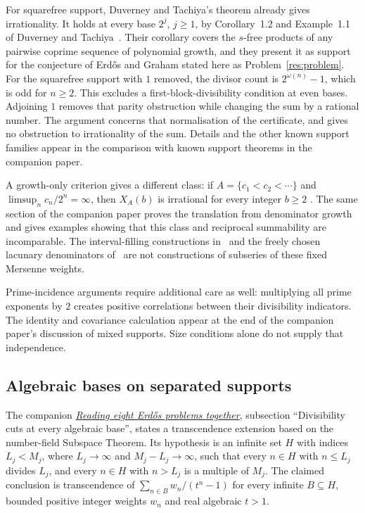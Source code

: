 \documentclass[11pt]{article}
\begin{document}
For squarefree support, Duverney and Tachiya's theorem already gives
irrationality.  It holds at every base $2^j$, $j\ge1$, by Corollary~1.2 and Example~1.1
of Duverney and Tachiya~\cite[p.~4]{duverneytachiya}.  Their corollary
covers the $s$-free products of any pairwise coprime sequence of polynomial
growth, and they present it as support for the conjecture of Erd\H{o}s and
Graham stated here as Problem~\ref{res:problem}.
For the squarefree support with $1$ removed, the divisor count is
$2^{\omega(n)}-1$, which is odd for $n\ge2$. This excludes a
first-block-divisibility condition at even bases. Adjoining $1$ removes
that parity obstruction while changing the sum by a rational number.
The argument concerns that normalisation of the certificate, and gives
no obstruction to irrationality of the sum. Details and the other known
support families appear in
{the comparison with known support theorems in the companion paper}.

A growth-only criterion gives a different class: if
$A=\{c_1<c_2<\cdots\}$ and $\limsup_n c_n/2^n=\infty$, then
$X_A(b)$ is irrational for every integer $b\ge2$
\cite[Theorem~1]{erdos1975}.  The same section of the companion paper proves the translation from
denominator growth and gives examples
showing that this class and reciprocal summability are incomparable.
The interval-filling constructions in~\cite{bkkkz2026} and the
freely chosen lacunary denominators of~\cite{vandoornkovac} are not
constructions of subseries of these fixed Mersenne weights.

Prime-incidence arguments require additional care as well: multiplying
all prime exponents by $2$ creates positive correlations between their
divisibility indicators.  The identity and covariance calculation appear at the end of
{the companion paper's discussion of mixed supports}.  Size conditions alone do not
supply that independence.

\subsection{Algebraic bases on separated supports}
\label{sec:separated-support-transfer}
The companion
\href{optimal-sparse-perturbations.pdf}{\emph{Reading eight Erd\H{o}s
problems together}}, subsection ``Divisibility cuts at every algebraic base'',
states a transcendence extension based on the number-field Subspace
Theorem. Its hypothesis is an infinite set $H$ with indices $L_j<M_j$,
where $L_j\to\infty$ and $M_j-L_j\to\infty$, such that every $n\in H$
with $n\le L_j$ divides $L_j$, and every $n\in H$ with $n>L_j$ is a
multiple of $M_j$. The claimed conclusion is transcendence of
$\sum_{n\in B}w_n/(t^n-1)$ for every infinite $B\subseteq H$, bounded
positive integer weights $w_n$ and real algebraic $t>1$.
\end{document}
